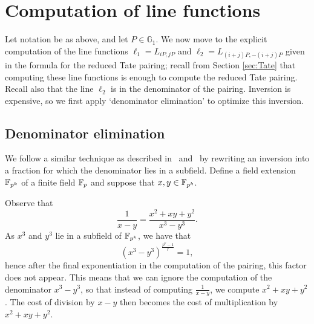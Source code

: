 \section{Computation of line functions}
\label{sec:formulas}

Let notation be as above, and let $P \in \mathbb{G}_{1}$. We now move to the explicit computation of the line functions
$\ell_{1} = L_{iP,jP}$ and $\ell_{2} = L_{(i+j)P,-(i+j)P}$
given in the formula for the reduced Tate pairing; recall from Section \ref{sec:Tate} that computing these line functions is enough to compute the reduced Tate pairing. Recall also that the line $\ell_{2}$ is in the denominator of the pairing. Inversion is expensive, so we first apply `denominator elimination' to optimize this inversion.

%
%
%


\subsection{Denominator elimination}
We follow a similar technique as described in~\cite{2008/lin} and~\cite{2009/deg15}
by rewriting an inversion into a fraction for which the denominator lies in a subfield.
Define a field extension $\mathbb{F}_{p^k}$ of a finite field $\mathbb{F}_{p}$ and suppose that $x,y \in \mathbb{F}_{p^k}$.

Observe that
$$ \frac{1}{x-y} = \frac{x^2 + xy + y^2}{x^3 - y^3}. $$
As $x^3$ and $y^3$ lie in a subfield of $\mathbb{F}_{p^k}$, we have that
\[(x^{3} - y^{3})^{\frac{p^{k}-1}{r}} = 1,\]
hence after the final exponentiation in the computation of the pairing, this factor does not appear.
This means that we can ignore the computation of the denominator $x^3 - y^3$, so that instead of computing $\frac{1}{x-y}$,
we compute $x^2 + xy + y^2$.
The cost of division by $x - y$ then becomes the cost of multiplication by $x^2 + xy + y^2$.

